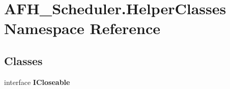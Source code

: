 \section{A\+F\+H\+\_\+\+Scheduler.\+Helper\+Classes Namespace Reference}
\label{namespace_a_f_h___scheduler_1_1_helper_classes}
\subsection*{Classes}
\begin{DoxyCompactItemize}
\item 
interface \textbf{ I\+Closeable}
\end{DoxyCompactItemize}
